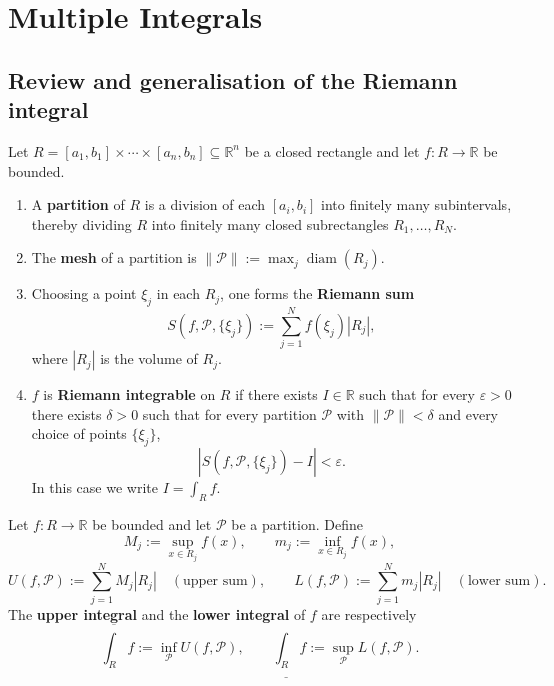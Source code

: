 \section{Multiple Integrals}

\subsection{Review and generalisation of the Riemann integral}

\begin{definition}\label{def:riemann_integral_rectangle}
Let $R = [a_1, b_1] \times \cdots \times [a_n, b_n] \subseteq \mathbb{R}^n$ be a closed rectangle and let $f: R \to \mathbb{R}$ be bounded.
\begin{enumerate}[label=(\roman*)]
    \item A \textbf{partition} of $R$ is a division of each $[a_i, b_i]$ into finitely many subintervals, thereby dividing $R$ into finitely many closed subrectangles $R_1, \dots, R_N$.
    \item The \textbf{mesh} of a partition is $\|\mathcal{P}\| := \max_j \operatorname{diam}(R_j)$.
    \item Choosing a point $\xi_j$ in each $R_j$, one forms the \textbf{Riemann sum}
    \[
    S(f, \mathcal{P}, \{\xi_j\}) := \sum_{j=1}^{N} f(\xi_j) |R_j|,
    \]
    where $|R_j|$ is the volume of $R_j$.
    \item $f$ is \textbf{Riemann integrable} on $R$ if there exists $I \in \mathbb{R}$ such that for every $\varepsilon > 0$ there exists $\delta > 0$ such that for every partition $\mathcal{P}$ with $\|\mathcal{P}\| < \delta$ and every choice of points $\{\xi_j\}$,
    \[
    |S(f, \mathcal{P}, \{\xi_j\}) - I| < \varepsilon.
    \]
    In this case we write $I = \int_R f$.
\end{enumerate}
\end{definition}

\begin{definition}\label{def:darboux_sums}
Let $f: R \to \mathbb{R}$ be bounded and let $\mathcal{P}$ be a partition. Define
\[
M_j := \sup_{x \in R_j} f(x), \qquad m_j := \inf_{x \in R_j} f(x),
\]
\[
U(f, \mathcal{P}) := \sum_{j=1}^{N} M_j |R_j| \quad (\text{upper sum}), \qquad
L(f, \mathcal{P}) := \sum_{j=1}^{N} m_j |R_j| \quad (\text{lower sum}).
\]
The \textbf{upper integral} and the \textbf{lower integral} of $f$ are respectively
\[
\overline{\int_R} f := \inf_{\mathcal{P}} U(f, \mathcal{P}), \qquad
\underline{\int_R} f := \sup_{\mathcal{P}} L(f, \mathcal{P}).
\]
\end{definition}

